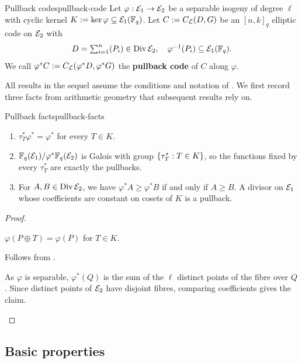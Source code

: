 \documentclass[twocolumn, 11pt]{scrartcl}
\begin{document}
\begin{definition}{Pullback codes}{pullback-code}
    Let $\varphi:\mathcal{E}_1\to\mathcal{E}_2$ be a separable isogeny of degree $\ell$ with cyclic kernel $K:=\ker\varphi\subseteq\mathcal{E}_1(\mathbb{F}_q)$. Let $C:=C_\mathcal{L}(D,G)$ be an $[n,k]_q$ elliptic code on $\mathcal{E}_2$ with
    \[ \textstyle D=\sum_{i=1}^n (P_i)\in\operatorname{Div}\mathcal{E}_2,\quad \varphi^{-1}(P_i)\subseteq\mathcal{E}_1(\mathbb{F}_q). \]
    We call $\varphi^*C:=C_\mathcal{L}(\varphi^*D,\varphi^*G)$ the \textbf{pullback code} of $C$ along $\varphi$.
\end{definition}

All results in the sequel assume the conditions and notation of . We first record three facts from arithmetic geometry that subsequent results rely on.

\begin{lemma}{Pullback facts}{pullback-facts}
\vspace{-6pt}
    \begin{enumerate}
        \item \label{enum:pf-translation} $\tau_T^*\varphi^*=\varphi^*$ for every $T\in K$.
        \item \label{enum:pf-galois} $\mathbb{F}_q(\mathcal{E}_1)/\varphi^*\mathbb{F}_q(\mathcal{E}_2)$ is Galois with group $\{\tau_T^*:T\in K\}$, so the functions fixed by every $\tau_T^*$ are exactly the pullbacks.
        \item \label{enum:pf-divisors} For $A,B\in\operatorname{Div}\mathcal{E}_2$, we have $\varphi^*A\geq\varphi^*B$ if and only if $A\geq B$. A divisor on $\mathcal{E}_1$ whose coefficients are constant on cosets of $K$ is a pullback.
    \end{enumerate}
\end{lemma}

\begin{proof}
\begin{enumerate*}
    \item $\varphi(P\oplus T)=\varphi(P)$ for $T\in K$.
    \item Follows from \cite[Thm.~III.4.10]{silverman2009arithmetic}.
    \item As $\varphi$ is separable, $\varphi^*(Q)$ is the sum of the $\ell$ distinct points of the fibre over $Q$. Since distinct points of $\mathcal{E}_2$ have disjoint fibres, comparing coefficients gives the claim. \qedhere
\end{enumerate*}
\end{proof}

\subsection{Basic properties} \label{subsection:basic-prop}
\end{document}
